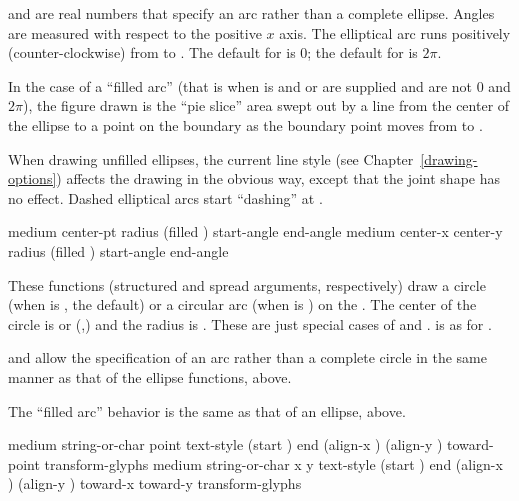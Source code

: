  and  are real numbers that specify an arc
rather than a complete ellipse.  Angles are measured with respect to the
positive $x$ axis.  The elliptical arc runs positively (counter-clockwise) from
 to .  The default for  is $0$;
the default for  is $2\pi$.

In the case of a ``filled arc'' (that is when  is  and
 or  are supplied and are not $0$ and $2\pi$),
the figure drawn is the ``pie slice'' area swept out by a line from the center
of the ellipse to a point on the boundary as the boundary point moves from
 to .

When drawing unfilled ellipses, the current line style (see
Chapter~\ref{drawing-options}) affects the drawing in the obvious way, except
that the joint shape has no effect.  Dashed elliptical arcs start ``dashing'' at
.


  {medium center-pt radius \key (filled ) start-angle end-angle
                       \DrawingOptions \LineCapOptions}
 {medium center-x center-y radius \key (filled ) start-angle end-angle
                       \DrawingOptions \LineCapOptions}

These functions (structured and spread arguments, respectively) draw a circle
(when  is , the default) or a circular arc (when
 is ) on the  .  The center of
the circle is  or (,) and the radius
is .  These are just special cases of  and
.   is as for .

 and  allow the specification of an arc rather
than a complete circle in the same manner as that of the ellipse functions,
above.

The ``filled arc'' behavior is the same as that of an ellipse, above.


  {medium string-or-char point
                     \key text-style (start ) end
                          (align-x ) (align-y )
                          toward-point transform-glyphs
                     \DrawingOptions \TextOptions}
 {medium string-or-char x y
                     \key text-style (start ) end
                          (align-x ) (align-y )
                          toward-x toward-y transform-glyphs
                     \DrawingOptions \TextOptions}

